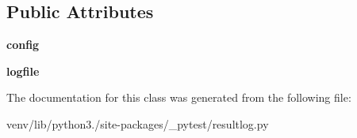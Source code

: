 \subsection*{Public Attributes}
\begin{DoxyCompactItemize}
\item 
\mbox{\label{class__pytest_1_1resultlog_1_1_result_log_a77c242b365b94a29e195a26df0f2f1a9}} 
{\bfseries config}
\item 
\mbox{\label{class__pytest_1_1resultlog_1_1_result_log_a16c7483235a582fecc8254790fc4a5f1}} 
{\bfseries logfile}
\end{DoxyCompactItemize}


The documentation for this class was generated from the following file\+:\begin{DoxyCompactItemize}
\item 
venv/lib/python3./site-\/packages/\+\_\+pytest/resultlog.\+py\end{DoxyCompactItemize}
